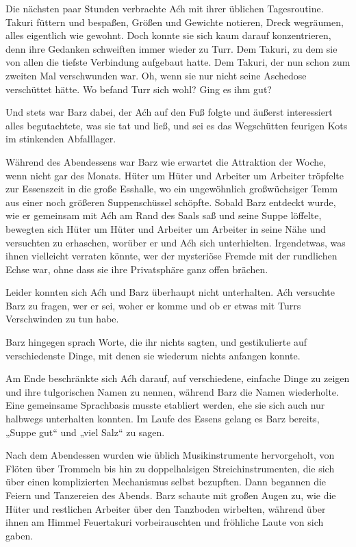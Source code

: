 Die nächsten paar Stunden verbrachte Aćh mit ihrer üblichen Tagesroutine. Takuri füttern und bespaßen, Größen und Gewichte notieren, Dreck wegräumen, alles eigentlich wie gewohnt. Doch konnte sie sich kaum darauf konzentrieren, denn ihre Gedanken schweiften immer wieder zu Turr. Dem Takuri, zu dem sie von allen die tiefste Verbindung aufgebaut hatte. Dem Takuri, der nun schon zum zweiten Mal verschwunden war. Oh, wenn sie nur nicht seine Aschedose verschüttet hätte. Wo befand Turr sich wohl? Ging es ihm gut?

Und stets war Barz dabei, der Aćh auf den Fuß folgte und äußerst interessiert alles begutachtete, was sie tat und ließ, und sei es das Wegschütten feurigen Kots im stinkenden Abfalllager.



\trennzeichen



Während des Abendessens war Barz wie erwartet die Attraktion der Woche, wenn nicht gar des Monats. Hüter um Hüter und Arbeiter um Arbeiter tröpfelte zur Essenszeit in die große Esshalle, wo ein ungewöhnlich großwüchsiger Temm aus einer noch größeren Suppenschüssel schöpfte. Sobald Barz entdeckt wurde, wie er gemeinsam mit Aćh am Rand des Saals saß und seine Suppe löffelte, bewegten sich Hüter um Hüter und Arbeiter um Arbeiter in seine Nähe und versuchten zu erhaschen, worüber er und Aćh sich unterhielten. Irgendetwas, was ihnen vielleicht verraten könnte, wer der mysteriöse Fremde mit der rundlichen Echse war, ohne dass sie ihre Privatsphäre ganz offen brächen.

Leider konnten sich Aćh und Barz überhaupt nicht unterhalten. Aćh versuchte Barz zu fragen, wer er sei, woher er komme und ob er etwas mit Turrs Verschwinden zu tun habe.

Barz hingegen sprach Worte, die ihr nichts sagten, und gestikulierte auf verschiedenste Dinge, mit denen sie wiederum nichts anfangen konnte.

Am Ende beschränkte sich Aćh darauf, auf verschiedene, einfache Dinge zu zeigen und ihre tulgorischen Namen zu nennen, während Barz die Namen wiederholte. Eine gemeinsame Sprachbasis musste etabliert werden, ehe sie sich auch nur halbwegs unterhalten konnten. Im Laufe des Essens gelang es Barz bereits, „Suppe gut“ und „viel Salz“ zu sagen.

Nach dem Abendessen wurden wie üblich Musikinstrumente hervorgeholt, von Flöten über Trommeln bis hin zu doppelhalsigen Streichinstrumenten, die sich über einen komplizierten Mechanismus selbst bezupften. Dann begannen die Feiern und Tanzereien des Abends. Barz schaute mit großen Augen zu, wie die Hüter und restlichen Arbeiter über den Tanzboden wirbelten, während über ihnen am Himmel Feuertakuri vorbeirauschten und fröhliche Laute von sich gaben.

